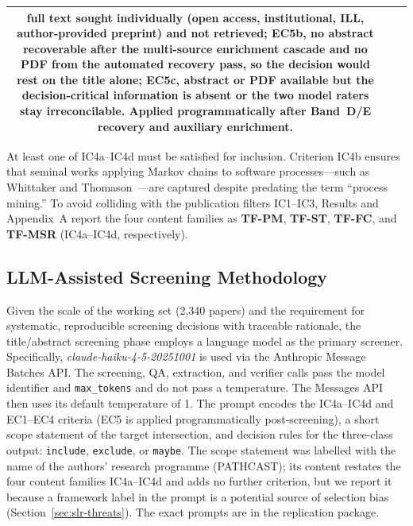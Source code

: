 \begin{table}[htbp]
\begin{tabular}{c c p{10.2cm}}
          full text sought individually (open access, institutional, ILL,
          author-provided preprint) and not retrieved; \textbf{EC5b}, no
          abstract recoverable after the multi-source enrichment cascade and
          no PDF from the automated recovery pass, so the decision would rest
          on the title alone; \textbf{EC5c}, abstract or PDF available but
          the decision-critical information is absent or the two model
          raters stay irreconcilable. Applied programmatically after
          Band~D/E recovery and auxiliary enrichment. \\
\bottomrule
\end{tabular}
\end{table}

At least one of IC4a--IC4d must be satisfied for inclusion. Criterion IC4b
ensures that seminal works applying Markov chains to software processes---such
as Whittaker and Thomason~\cite{whittaker1994}---are captured despite
predating the term ``process mining.''
To avoid colliding with the publication filters IC1--IC3, Results and
Appendix~A report the four content families as \textbf{TF-PM}, \textbf{TF-ST},
\textbf{TF-FC}, and \textbf{TF-MSR} (IC4a--IC4d, respectively).


\subsection{LLM-Assisted Screening Methodology}
\label{sec:slr-llm}

Given the scale of the working set (2{,}340 papers) and the requirement for
systematic, reproducible screening decisions with traceable rationale, the
title/abstract screening phase employs a language model as the primary
screener. Specifically, \textit{claude-haiku-4-5-20251001} is used via the
Anthropic Message Batches API. The screening, QA, extraction, and
verifier calls pass the model identifier and \texttt{max\_tokens} and do
not pass a temperature. The Messages API then uses its default
temperature of 1. The prompt encodes the IC4a--IC4d
and EC1--EC4 criteria (EC5 is applied programmatically post-screening), a
short scope statement of the target intersection, and decision rules for
the three-class output: \texttt{include}, \texttt{exclude}, or \texttt{maybe}.
The scope statement was labelled with the name of the authors' research
programme (PATHCAST); its content restates the four content families
IC4a--IC4d and adds no further criterion, but we report it because a
framework label in the prompt is a potential source of selection bias
(Section~\ref{sec:slr-threats}). The exact prompts are in the replication
package.

